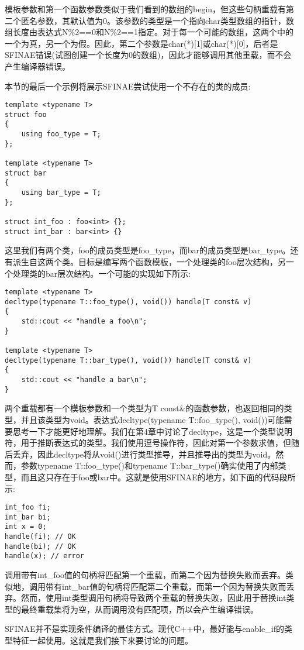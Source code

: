 模板参数和第一个函数参数类似于我们看到的数组的begin，但这些句柄重载有第二个匿名参数，其默认值为0。该参数的类型是一个指向char类型数组的指针，数组长度由表达式N\%2==0和N\%2==1指定。对于每一个可能的数组，这两个中的一个为真，另一个为假。因此，第二个参数是char(*)[1]或char(*)[0]，后者是SFINAE错误(试图创建一个长度为0的数组)，因此才能够调用其他重载，而不会产生编译器错误。

本节的最后一个示例将展示SFINAE尝试使用一个不存在的类的成员:

\begin{lstlisting}[style=styleCXX]
template <typename T>
struct foo
{
	using foo_type = T;
};

template <typename T>
struct bar
{
	using bar_type = T;
};

struct int_foo : foo<int> {};
struct int_bar : bar<int> {}
\end{lstlisting}

这里我们有两个类，foo的成员类型是foo\_type，而bar的成员类型是bar\_type。还有派生自这两个类。目标是编写两个函数模板，一个处理类的foo层次结构，另一个处理类的bar层次结构。一个可能的实现如下所示:

\begin{lstlisting}[style=styleCXX]
template <typename T>
decltype(typename T::foo_type(), void()) handle(T const& v)
{
	std::cout << "handle a foo\n";
}

template <typename T>
decltype(typename T::bar_type(), void()) handle(T const& v)
{
	std::cout << "handle a bar\n";
}
\end{lstlisting}

两个重载都有一个模板参数和一个类型为T const\&的函数参数，也返回相同的类型，并且该类型为void。表达式decltype(typename T::foo\_type(), void())可能需要思考一下才能更好地理解。我们在第4章中讨论了decltype，这是一个类型说明符，用于推断表达式的类型。我们使用逗号操作符，因此对第一个参数求值，但随后丢弃，因此decltype将从void()进行类型推导，并且推导出的类型为void。然而，参数typename T::foo\_type()和typename T::bar\_type()确实使用了内部类型，而且这只存在于foo或bar中。这就是使用SFINAE的地方，如下面的代码段所示:

\begin{lstlisting}[style=styleCXX]
int_foo fi;
int_bar bi;
int x = 0;
handle(fi); // OK
handle(bi); // OK
handle(x); // error
\end{lstlisting}

调用带有int\_foo值的句柄将匹配第一个重载，而第二个因为替换失败而丢弃。类似地，调用带有int\_bar值的句柄将匹配第二个重载，而第一个因为替换失败而丢弃。然而，使用int类型调用句柄将导致两个重载的替换失败，因此用于替换int类型的最终重载集将为空，从而调用没有匹配项，所以会产生编译错误。

SFINAE并不是实现条件编译的最佳方式。现代C++中，最好能与enable\_if的类型特征一起使用。这就是我们接下来要讨论的问题。






















